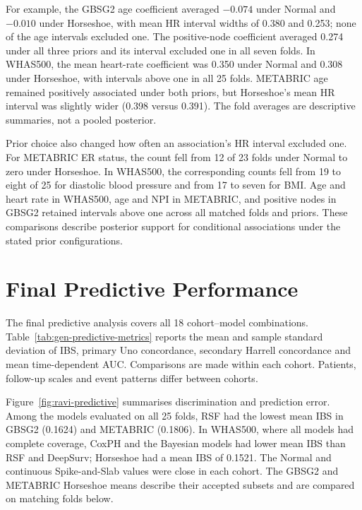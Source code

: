For example, the GBSG2 age coefficient averaged $-0.074$ under Normal and $-0.010$ under Horseshoe, with mean HR interval widths of 0.380 and 0.253; none of the age intervals excluded one. The positive-node coefficient averaged 0.274 under all three priors and its interval excluded one in all seven folds. In WHAS500, the mean heart-rate coefficient was 0.350 under Normal and 0.308 under Horseshoe, with intervals above one in all 25 folds. METABRIC age remained positively associated under both priors, but Horseshoe's mean HR interval was slightly wider (0.398 versus 0.391). The fold averages are descriptive summaries, not a pooled posterior.

Prior choice also changed how often an association's HR interval excluded one. For METABRIC ER status, the count fell from 12 of 23 folds under Normal to zero under Horseshoe. In WHAS500, the corresponding counts fell from 19 to eight of 25 for diastolic blood pressure and from 17 to seven for BMI. Age and heart rate in WHAS500, age and NPI in METABRIC, and positive nodes in GBSG2 retained intervals above one across all matched folds and priors. These comparisons describe posterior support for conditional associations under the stated prior configurations.

\section{Final Predictive Performance}\label{final-predictive-performance}

The final predictive analysis covers all 18 cohort--model combinations. Table~\ref{tab:gen-predictive-metrics} reports the mean and sample standard deviation of IBS, primary Uno concordance, secondary Harrell concordance and mean time-dependent AUC. Comparisons are made within each cohort. Patients, follow-up scales and event patterns differ between cohorts.



Figure~\ref{fig:ravi-predictive} summarises discrimination and prediction error. Among the models evaluated on all 25 folds, RSF had the lowest mean IBS in GBSG2 (0.1624) and METABRIC (0.1806). In WHAS500, where all models had complete coverage, CoxPH and the Bayesian models had lower mean IBS than RSF and DeepSurv; Horseshoe had a mean IBS of 0.1521. The Normal and continuous Spike-and-Slab values were close in each cohort. The GBSG2 and METABRIC Horseshoe means describe their accepted subsets and are compared on matching folds below.

